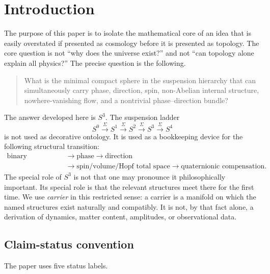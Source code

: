 \documentclass[11pt,a4paper]{article}
\theoremstyle{definition}
\theoremstyle{remark}
\newcommand{\Szero}{S^{0}}
\newcommand{\Sone}{S^{1}}
\newcommand{\Stwo}{S^{2}}
\newcommand{\Sthree}{S^{3}}
\newcommand{\Sfour}{S^{4}}
\begin{document}
\tableofcontents

\section{Introduction}

The purpose of this paper is to isolate the mathematical core of an idea that is easily
overstated if presented as cosmology before it is presented as topology.  The core question is not
``why does the universe exist?'' and not ``can topology alone explain all physics?''  The precise
question is the following.

\begin{quote}
What is the minimal compact sphere in the suspension hierarchy that can simultaneously carry
phase, direction, spin, non-Abelian internal structure, nowhere-vanishing flow, and a nontrivial
phase--direction bundle?
\end{quote}

The answer developed here is $\Sthree$.  The suspension ladder
\begin{equation}
\Szero \xrightarrow{\Sigma} \Sone \xrightarrow{\Sigma} \Stwo
\xrightarrow{\Sigma} \Sthree \xrightarrow{\Sigma} \Sfour
\label{eq:suspension-ladder}
\end{equation}
is not used as decorative ontology.  It is used as a bookkeeping device for the following
structural transition:
\[
\begin{aligned}
\text{binary distinction}
&\longrightarrow \text{phase}
\longrightarrow \text{direction}\\
&\longrightarrow \text{spin/volume/Hopf total space}
\longrightarrow \text{quaternionic compensation}.
\end{aligned}
\]
The special role of $\Sthree$ is not that one may pronounce it philosophically important.  Its
special role is that the relevant structures meet there for the first time.  We use
\emph{carrier} in this restricted sense: a carrier is a manifold on which the named structures
exist naturally and compatibly.  It is not, by that fact alone, a derivation of dynamics,
matter content, amplitudes, or observational data.

\subsection{Claim-status convention}

The paper uses five status labels.
\end{document}
